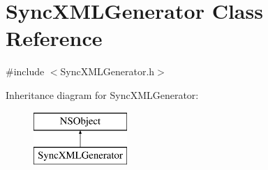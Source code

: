 \hypertarget{interface_sync_x_m_l_generator}{
\section{\-Sync\-X\-M\-L\-Generator \-Class \-Reference}
\label{interface_sync_x_m_l_generator}
}


{\ttfamily \#include $<$\-Sync\-X\-M\-L\-Generator.\-h$>$}

\-Inheritance diagram for \-Sync\-X\-M\-L\-Generator\-:\begin{figure}[H]
\begin{center}
\leavevmode
\includegraphics[height=2.000000cm]{interface_sync_x_m_l_generator}
\end{center}
\end{figure}
